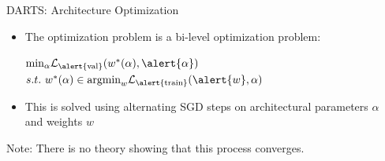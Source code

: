 \documentclass[main]{subfiles}
\begin{document}
\begin{frame}{DARTS: Architecture Optimization}
    \begin{itemize}
		\item The optimization problem is a bi-level optimization problem:
        \begin{center}
		\footnotesize{
					\begin{tcolorbox}[width = 8cm,halign=center,valign=center]
					$\text{min}_{\alpha} \mathcal{L}_{\text{\alert{val}}}(w^*(\alpha), \alert{\alpha})$\\
					$s.t.\ w^*(\alpha) \in \text{argmin}_{w} \mathcal{L}_{\text{\alert{train}}}(\alert{w},\alpha)$
			\end{tcolorbox}
		}
		\end{center}	
		\item This is solved using alternating SGD steps on architectural parameters $\alpha$\\and weights $w$ 
		
    \end{itemize}
        

    
		 Note: There is no theory showing that this process converges.
    
\end{frame}
\end{document}
